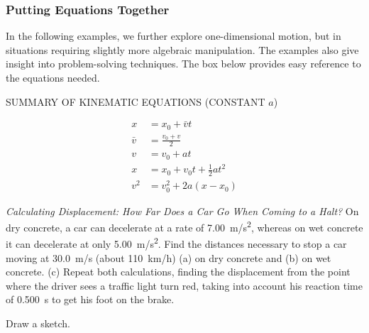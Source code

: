 \documentclass[../../main-ap-physics.tex]{subfiles}
\begin{document}
\subsubsection*{Putting Equations Together}

In the following examples, we further explore one-dimensional motion, but in situations requiring slightly more algebraic manipulation. The examples also give insight into problem-solving techniques. The box below provides easy reference to the equations needed.

\begin{gradient}{SUMMARY OF KINEMATIC EQUATIONS (CONSTANT $a$)}

\vspace{-1em}

    \begin{align}
        x &= x_0 + \bar{v} t \label{X0SPQW} \\[1ex]
        \bar{v} &= \frac{v_0 + v}{2} \label{robof8} \\[1ex]
        v &= v_0 + at \\[1ex]
        x &= x_0 + v_0t + \frac{1}{2} a t^2 \label{eo2SPc} \\[1ex]
        v^2 &= v_0^2 + 2a (x - x_0) \label{EEJoew}
    \end{align}
\end{gradient}

\begin{example}
    \textit{Calculating Displacement: How Far Does a Car Go When Coming to a Halt?} On dry concrete, a car can decelerate at a rate of \SI{7.00}{m/s^2}, whereas on wet concrete it can decelerate at only \SI{5.00}{m/s^2}. Find the distances necessary to stop a car moving at \SI{30.0}{m/s} (about \SI{110}{km/h}) (a) on dry concrete and (b) on wet concrete. (c) Repeat both calculations, finding the displacement from the point where the driver sees a traffic light turn red, taking into account his reaction time of \SI{0.500}{s} to get his foot on the brake.
\end{example}

\Solution Draw a sketch.

\begin{center}
\end{center}
\end{document}
